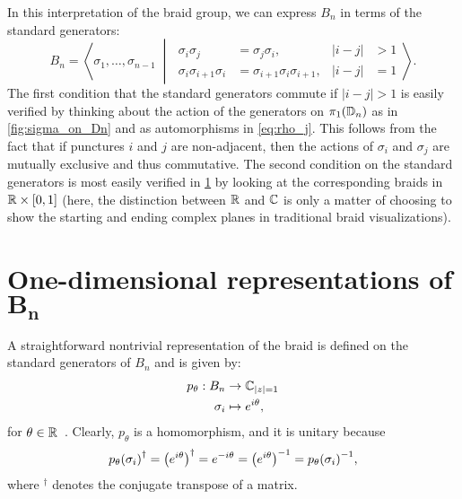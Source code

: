 In this interpretation of the braid group, we can express $B_n$ in terms of the standard generators:
\begin{equation}\label{eq:BnGenYangBaxter}
    B_n = \left\langle \sigma_1,\dots,\sigma_{n-1} \;\middle|\;
    \begin{aligned}
        \sigma_i\sigma_j &= \sigma_j\sigma_i, & |i-j|&>1 \\
        \sigma_i\sigma_{i+1}\sigma_i &= \sigma_{i+1}\sigma_i\sigma_{i+1}, & |i-j|&=1
    \end{aligned}
    \right\rangle.
\end{equation}
The first condition that the standard generators commute if $|i-j|>1$ is easily verified by thinking about the action of the generators on $\pi_1(\mathbb{D}_n)$ as in \cref{fig:sigma_on_Dn} and as automorphisms in \cref{eq:rho_j}. This follows from the fact that if punctures $i$ and $j$ are non-adjacent, then the actions of $\sigma_i$ and $\sigma_j$ are mutually exclusive and thus commutative. The second condition on the standard generators is most easily verified in \cref{fig:YB_criterion_verification} by looking at the corresponding braids in $\mathbb{R}\times[0,1]$ (here, the distinction between $\mathbb{R}$ and $\mathbb{C}$ is only a matter of choosing to show the starting and ending complex planes in traditional braid visualizations).
\begin{figure}[htbp]
    \centering
    
    \label{fig:YB_criterion_verification}
\end{figure}

\section[One-dimensional representations of $B_n$]{One-dimensional representations of $\mathbf{B_n}$}\label{sec:1D_rep}
A straightforward nontrivial representation of the braid is defined on the standard generators of $B_n$ and is given by:
\begin{align}
    p_\theta: B_n&\to \mathbb{C}_{\left|z\right|=1} \\
    \sigma_i &\mapsto e^{i\theta},
\end{align}
for $\theta\in\mathbb{R}$~\cite{Deshmukh}. Clearly, $p_\theta$ is a homomorphism, and it is unitary because
\begin{equation}
    {p_\theta(\sigma_i)}^\dagger = {\left( e^{i\theta} \right)}^\dagger = e^{-i\theta} = { \left( e^{i\theta} \right) }^{-1} = { p_\theta(\sigma_i) }^{-1},
\end{equation}
where $^\dagger$ denotes the conjugate transpose of a matrix. 

